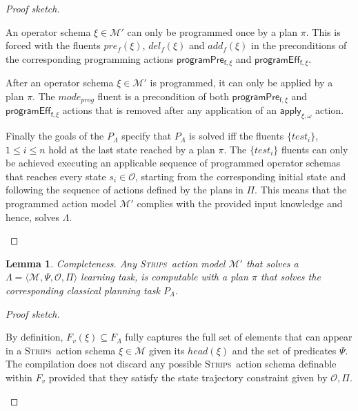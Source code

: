 \documentclass[3p,times]{elsarticle}
\newtheorem{mylemma}[mytheorem]{Lemma}
\newcommand{\strips}{\textsc{Strips}}     %
\newcommand{\tup}[1]{{\langle #1 \rangle}}
\begin{document}
\begin{proof}[Proof sketch]
  \begin{small}
    An operator schema $\xi\in\mathcal{M}'$ can only be programmed once by a plan $\pi$. This is forced with the fluents $pre_f(\xi)$, $del_f(\xi)$ and $add_f(\xi)$ in the preconditions of the corresponding programming actions $\mathsf{programPre_{f,\xi}}$ and $\mathsf{programEff_{f,\xi}}$.
    
    After an operator schema $\xi\in\mathcal{M}'$ is programmed, it can only be applied by a plan $\pi$. The $mode_{prog}$ fluent is a precondition of both $\mathsf{programPre_{f,\xi}}$ and $\mathsf{programEff_{f,\xi}}$ actions that is removed after any application of an $\mathsf{apply_{\xi,\omega}}$ action.

    Finally the goals of the $P_{\Lambda}$ specify that $P_{\Lambda}$ is solved iff the fluents $\{test_i\}$, {\small $1\leq i\leq n$} hold at the last state reached by a plan $\pi$. The $\{test_i\}$ fluents can only be achieved executing an applicable sequence of programmed operator schemas that reaches every state $s_i\in\mathcal{O}$, starting from the corresponding initial state and following the sequence of actions defined by the plans in $\Pi$. This means that the programmed action model $\mathcal{M}'$ complies with the provided input knowledge and hence, solves $\Lambda$.
\end{small}
\end{proof}


\begin{mylemma}
Completeness. Any \strips\ action model $\mathcal{M}'$ that solves a $\Lambda=\tup{\mathcal{M},\Psi,\mathcal{O},\Pi}$ learning task, is computable with a plan $\pi$ that solves the corresponding classical planning task $P_{\Lambda}$.
\end{mylemma}

\begin{proof}[Proof sketch]
\begin{small}
By definition, $F_v(\xi)\subseteq F_\Lambda$ fully captures the full set of elements that can appear in a \strips\ action schema $\xi\in\mathcal{M}$ given its $head(\xi)$ and the set of predicates $\Psi$. The compilation does not discard any possible \strips\ action schema definable within $F_v$ provided that they satisfy the state trajectory constraint given by $\mathcal{O},\Pi$.
\end{small}
\end{proof}
\end{document}
